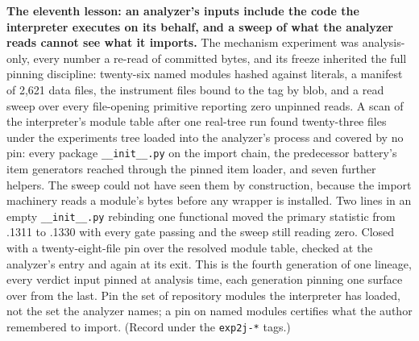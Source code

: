 \textbf{The eleventh lesson: an analyzer's inputs include the code the
interpreter executes on its behalf, and a sweep of what the analyzer
reads cannot see what it imports.} The mechanism experiment was
analysis-only, every number a re-read of committed bytes, and its
freeze inherited the full pinning discipline: twenty-six named modules
hashed against literals, a manifest of 2,621 data files, the
instrument files bound to the tag by blob, and a read sweep over every
file-opening primitive reporting zero unpinned reads. A scan of the
interpreter's module table after one real-tree run found twenty-three
files under the experiments tree loaded into the analyzer's process
and covered by no pin: every package \texttt{\_\_init\_\_.py} on the import
chain, the predecessor battery's item generators reached through the
pinned item loader, and seven further helpers. The sweep could not
have seen them by construction, because the import machinery reads a
module's bytes before any wrapper is installed. Two lines in an empty
\texttt{\_\_init\_\_.py} rebinding one functional moved the primary statistic
from .1311 to .1330 with every gate passing and the sweep still
reading zero. Closed with a twenty-eight-file pin over the resolved
module table, checked at the analyzer's entry and again at its exit.
This is the fourth generation of one lineage, every verdict input
pinned at analysis time, each generation pinning one surface over from
the last. Pin the set of repository modules the interpreter has
loaded, not the set the analyzer names; a pin on named modules
certifies what the author remembered to import. (Record under the
\texttt{exp2j-*} tags.)

